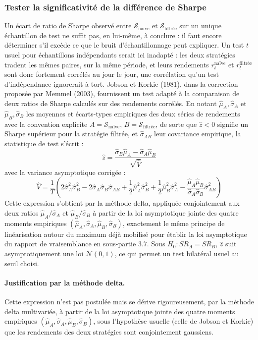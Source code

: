 \documentclass{article}
\begin{document}
\subsubsection*{Tester la significativité de la différence de Sharpe}
Un écart de ratio de Sharpe observé entre $\mathcal{S}_{\text{naïve}}$ et $\mathcal{S}_{\text{filtrée}}$ sur un unique échantillon de test ne suffit pas, en lui-même, à conclure : il faut encore déterminer s'il excède ce que le bruit d'échantillonnage peut expliquer. Un test $t$ usuel pour échantillons indépendants serait ici inadapté : les deux stratégies tradent les mêmes paires, sur la même période, et leurs rendements $r_t^{\text{naïve}}$ et $r_t^{\text{filtrée}}$ sont donc fortement corrélés au jour le jour, une corrélation qu'un test d'indépendance ignorerait à tort.
Jobson et Korkie (1981), dans la correction proposée par Memmel (2003), fournissent un test adapté à la comparaison de deux ratios de Sharpe calculés sur des rendements corrélés. En notant $\hat\mu_A,\hat\sigma_A$ et $\hat\mu_B,\hat\sigma_B$ les moyennes et écarts-types empiriques des deux séries de rendements avec la convention explicite $A=\mathcal{S}_{\text{naïve}}$, $B=\mathcal{S}_{\text{filtrée}}$, de sorte que $\hat z<0$ signifie un Sharpe supérieur pour la stratégie filtrée, et $\hat\sigma_{AB}$ leur covariance empirique, la statistique de test s'écrit :
\begin{equation}
\hat z = \frac{\hat\sigma_B\hat\mu_A - \hat\sigma_A\hat\mu_B}{\sqrt{\hat{V}}}
\end{equation}
avec la variance asymptotique corrigée :
\begin{equation}
\hat{V} = \frac{1}{T}\left(2\hat\sigma_A^2\hat\sigma_B^2 - 2\hat\sigma_A\hat\sigma_B\hat\sigma_{AB} + \frac{1}{2}\hat\mu_A^2\hat\sigma_B^2 + \frac{1}{2}\hat\mu_B^2\hat\sigma_A^2 - \frac{\hat\mu_A\hat\mu_B}{\hat\sigma_A\hat\sigma_B}\hat\sigma_{AB}^2\right)
\end{equation}
Cette expression s'obtient par la méthode delta, appliquée conjointement aux deux ratios $\hat\mu_A/\hat\sigma_A$ et $\hat\mu_B/\hat\sigma_B$ à partir de la loi asymptotique jointe des quatre moments empiriques $(\hat\mu_A,\hat\sigma_A,\hat\mu_B,\hat\sigma_B)$, exactement le même principe de linéarisation autour du maximum déjà mobilisé pour établir la loi asymptotique du rapport de vraisemblance en sous-partie 3.7. Sous $H_0: SR_A=SR_B$, $\hat z$ suit asymptotiquement une loi $\mathcal{N}(0,1)$, ce qui permet un test bilatéral usuel au seuil choisi.

\paragraph{Justification par la méthode delta.}
Cette expression n'est pas postulée mais se dérive rigoureusement, par la méthode delta multivariée, à partir de la loi asymptotique jointe des quatre moments empiriques $(\hat\mu_A,\hat\sigma_A,\hat\mu_B,\hat\sigma_B)$, sous l'hypothèse usuelle (celle de Jobson et Korkie) que les rendements des deux stratégies sont conjointement gaussiens.
\end{document}
